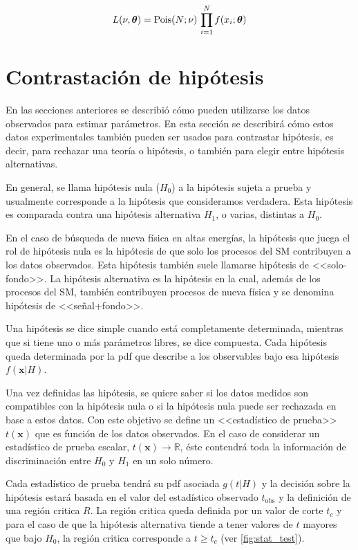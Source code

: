 \begin{equation}
  L(\nu,\bm{\theta}) = \operatorname{Pois}(N;\nu) \, \prod_{i=1}^{N} f(x_i; \bm{\theta})
  \label{eq:likelihood_ext}
\end{equation}


\section{Contrastación de hipótesis}
\label{sec:testhypo}

En las secciones anteriores se describió cómo pueden utilizarse los datos
observados para estimar parámetros. En esta sección se describirá cómo estos
datos experimentales también pueden ser usados para contrastar hipótesis, es
decir, para rechazar una teoría o hipótesis, o también para elegir
entre hipótesis alternativas.

En general, se llama hipótesis nula ($H_0$) a la hipótesis sujeta a prueba y
usualmente corresponde a la hipótesis que consideramos verdadera. Esta hipótesis
es comparada contra una hipótesis alternativa $H_1$, o varias, distintas a $H_0$.

En el caso de búsqueda de nueva física en altas energías, la hipótesis que juega el rol de
hipótesis nula es la hipótesis de que solo los procesos del SM contribuyen a los
datos observados. Esta hipótesis también suele llamarse hipótesis de
<<solo-fondo>>. La hipótesis alternativa es la hipótesis en la cual, además
de los procesos del SM, también contribuyen procesos de nueva física y se
denomina hipótesis de <<se\~nal+fondo>>.

Una hipótesis se dice simple cuando está completamente determinada,
mientras que si tiene uno o más parámetros libres, se dice compuesta.
Cada hipótesis queda determinada por la pdf que describe a los observables bajo
esa hipótesis $f(\bm{x}|H)$.

Una vez definidas las hipótesis, se quiere saber si los datos medidos son
compatibles con la hipótesis nula o si la hipótesis nula puede ser rechazada en
base a estos datos. Con este objetivo se define un <<estadístico de prueba>>
$t(\bm{x})$ que es función de los datos observados. En el caso de considerar un
estadístico de prueba escalar, $t(\bm{x}) \to \mathbb{R}$, éste contendrá toda la
información de discriminación entre $H_0$ y $H_1$ en un solo número.

Cada estadístico de prueba tendrá su pdf asociada $g(t|H)$ y la decisión sobre
la hipótesis estará basada en el valor del estadístico observado $t_\text{obs}$
y la definición de una región critica $R$. La región critica queda
definida por un valor de corte $t_c$ y para el caso de que la hipótesis
alternativa tiende a tener valores de $t$ mayores que bajo $H_0$, la región
critica corresponde a $t \geq t_c$ (ver \cref{fig:stat_test}).

